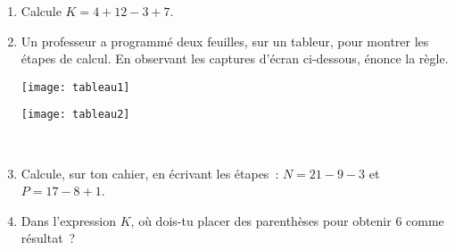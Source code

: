 \begin{activite}
\begin{partie}
\end{partie}

\begin{partie}
\begin{enumerate}
 \item Calcule $K = 4 + 12 - 3 + 7$.
 \item Un professeur a programmé deux feuilles, sur un tableur, pour montrer les étapes de calcul. En observant les captures d'écran ci-dessous, énonce la règle. \\[1em]
 \begin{minipage}{0.4\textwidth}
  \texttt{[image: tableau1]}
  \end{minipage} \hfill%
   \begin{minipage}{0.4\textwidth}
    \texttt{[image: tableau2]}
    \end{minipage}\\
 \item Calcule, sur ton cahier, en écrivant les étapes :  $N = 21 - 9 - 3$  et  $P = 17 - 8 + 1$.
 \item Dans l'expression $K$, où dois-tu placer des parenthèses pour obtenir 6 comme résultat ?
 \end{enumerate}
\end{partie}

\end{activite}


